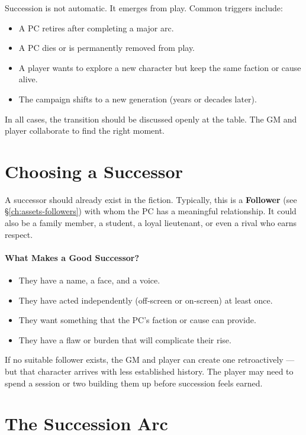 Succession is not automatic. It emerges from play. Common triggers include:

\begin{itemize}
  \item A PC retires after completing a major arc.
  \item A PC dies or is permanently removed from play.
  \item A player wants to explore a new character but keep the same faction or cause alive.
  \item The campaign shifts to a new generation (years or decades later).
\end{itemize}

In all cases, the transition should be discussed openly at the table. The GM and player collaborate to find the right moment.

\section{Choosing a Successor}
\label{sec:choosing-successor}

A successor should already exist in the fiction. Typically, this is a \textbf{Follower} (see \S\ref{ch:assets-followers}) with whom the PC has a meaningful relationship. It could also be a family member, a student, a loyal lieutenant, or even a rival who earns respect.

\paragraph{What Makes a Good Successor?}
\begin{itemize}
  \item They have a name, a face, and a voice.
  \item They have acted independently (off‑screen or on‑screen) at least once.
  \item They want something that the PC’s faction or cause can provide.
  \item They have a flaw or burden that will complicate their rise.
\end{itemize}

If no suitable follower exists, the GM and player can create one retroactively — but that character arrives with less established history. The player may need to spend a session or two building them up before succession feels earned.

\section{The Succession Arc}
\label{sec:succession-arc}

